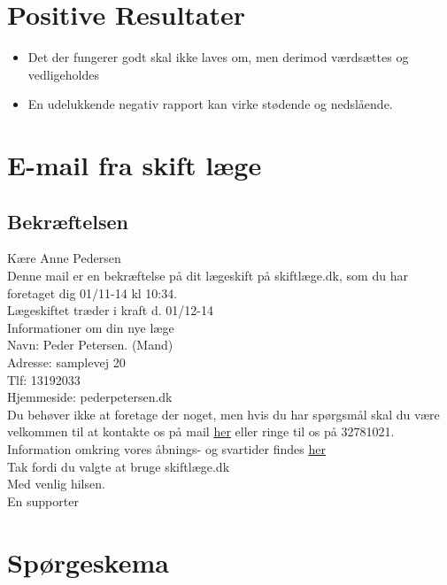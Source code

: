 \documentclass[12pt,a4paper,oneside]{article}
\begin{document}
\section{Positive Resultater}

\begin{itemize}
\item{Det der fungerer godt skal ikke laves om, men derimod værdsættes og vedligeholdes}
\item{En udelukkende negativ rapport kan virke stødende og nedslående.}
\end{itemize}


\newpage

\section{E-mail fra skift læge}

\subsection{Bekræftelsen}

Kære Anne Pedersen\\

Denne mail er en bekræftelse på dit lægeskift på skiftlæge.dk, som du har foretaget dig 01/11-14 kl 10:34.\\

Lægeskiftet træder i kraft d. 01/12-14\\

Informationer om din nye læge\\

Navn: Peder Petersen. (Mand)\\
Adresse: samplevej 20\\
Tlf: 13192033\\
Hjemmeside: pederpetersen.dk\\

Du behøver ikke at foretage der noget, men hvis du har spørgsmål skal du være velkommen til at kontakte os på mail \underline{her} eller ringe til os på 32781021.\\
Information omkring vores åbnings- og svartider findes \underline{her}\\

Tak fordi du valgte at bruge skiftlæge.dk\\

Med venlig hilsen.\\
En supporter

\section{Spørgeskema}
\end{document}
